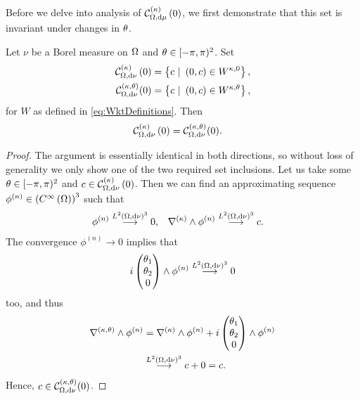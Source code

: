 Before we delve into analysis of $\mathcal{C}_{ \Omega, \mathrm{d}\mu}^{(\kappa)}\left( 0 \right)$, we first demonstrate that this set is invariant under changes in $\theta$.
\begin{prop}
	Let $\nu$ be a Borel measure on $\Omega$ and $\theta\in[-\pi,\pi)^2$.
	Set
	\begin{align*}
		\kcurlZero{\ddom}{\nu} &= \clbracs{ c \ \vert \ \bracs{0,c}\in W^{\wavenumber, 0}}, \\
		\mathcal{C}_{\ddom, \md\nu}^{\kt}(0) &= \clbracs{ c \ \vert \ \bracs{0,c}\in W^{\wavenumber, \qm} },
	\end{align*}
	for $W$ as defined in \eqref{eq:WktDefinitions}.
	Then
	\begin{align*}
		\mathcal{C}_{ \Omega, \mathrm{d}\nu}^{(\kappa)}\left( 0 \right) &= \mathcal{C}_{\Omega, \mathrm{d}\nu}^{\left( \kappa, \theta \right)}(0).
	\end{align*}
\end{prop}
\begin{proof}
	The argument is essentially identical in both directions, so without loss of generality we only show one of the two required set inclusions.
	Let us take some $\theta\in[-\pi,\pi)^2$ and $c\in\mathcal{C}_{ \Omega, \mathrm{d}\nu}^{(\kappa)}\left( 0 \right)$.
	Then we can find an approximating sequence $\phi^{(n)}\in\left( C^{\infty}\left( \Omega \right) \right)^3$ such that
	\begin{align*}
		\phi^{(n)} \overset{L^{2}\left( \Omega,\mathrm{d}\nu \right)^3}{\longrightarrow} 0, &\quad \nabla_{}^{(\kappa)}\wedge\phi^{(n)} \overset{L^{2}\left( \Omega,\mathrm{d}\nu \right)^3}{\longrightarrow} c.
	\end{align*}
	The convergence $\phi^{(n)}\rightarrow0$ implies that 
	\begin{align*}
		i \begin{pmatrix} \theta_1 \\ \theta_2 \\ 0\end{pmatrix}\wedge\phi^{(n)}\overset{L^{2}\left( \Omega,\mathrm{d}\nu \right)^3}{\longrightarrow} 0
	\end{align*}
	too, and thus
	\begin{align*}
		\nabla_{}^{\left( \kappa, \theta \right)}\wedge\phi^{(n)} &= \nabla_{}^{(\kappa)}\wedge\phi^{(n)} + i\begin{pmatrix} \theta_1 \\ \theta_2 \\ 0\end{pmatrix}\wedge\phi^{(n)} \\
		&\overset{L^{2}\left( \Omega,\mathrm{d}\nu \right)^3}{\longrightarrow} c + 0 = c.
	\end{align*}
	Hence, $c\in \mathcal{C}_{\Omega, \mathrm{d}\nu}^{\left( \kappa, \theta \right)}(0)$.
\end{proof}

